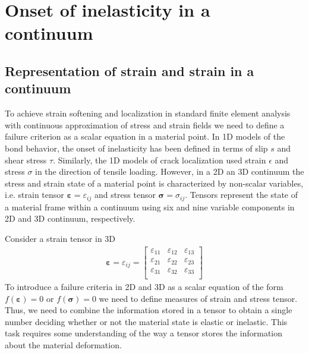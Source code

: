 \documentclass[main.tex]{subfiles}
\begin{document}
\chapter{Onset of inelasticity in a continuum}
\label{LEC:ContinuumInelasticity}

\section{Representation of strain and strain in a continuum}
\label{Sec:tensor_representation}
To achieve strain softening and localization in standard finite element analysis with continuous approximation of stress and strain fields we need to define a failure criterion as a scalar equation in a material point. In 1D models of the bond behavior, the onset of inelasticity has been 
defined in terms of slip $s$ and shear stress $\tau$. Similarly, the 1D models of crack localization used  strain $\epsilon$ and stress $\sigma$ in the direction of tensile loading. However, in a 2D an 3D continuum the stress and strain state of a material point is characterized by non-scalar variables, i.e. strain tensor 
$\boldsymbol{\varepsilon} = \varepsilon_{ij}$ and stress tensor $\boldsymbol{\sigma} = \sigma_{ij}$.
Tensors represent the state of a material frame within a continuum using six and nine variable components 
in 2D and 3D continuum, respectively.

Consider a strain tensor in 3D
\begin{align}
    \label{3d_strain_tensor}
    \boldsymbol{\varepsilon} = \varepsilon_{ij} =
    \left[    
    \begin{array}{ccc}
         \varepsilon_{11} & \varepsilon_{12} & \varepsilon_{13}  \\
         \varepsilon_{21} & \varepsilon_{22} & \varepsilon_{23}  \\
         \varepsilon_{31} & \varepsilon_{32} & \varepsilon_{33}  \\
    \end{array}
    \right]
\end{align}
To introduce a failure criteria in 2D and 3D as a scalar equation of the form 
$f(\boldsymbol{\varepsilon})=0$ or $f(\boldsymbol{\sigma})=0$ we need to define measures 
of strain and stress tensor. Thus, we need to combine the information stored in a tensor
to obtain a single number deciding whether or not the material state is elastic or inelastic.
This task requires some understanding of the way a tensor stores the information about the
material deformation.
\end{document}
